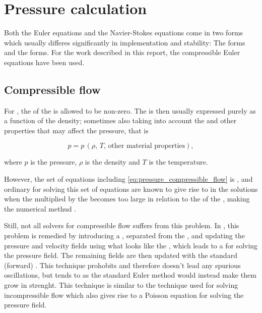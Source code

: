 \section{Pressure calculation}

Both the Euler equations and the Navier-Stokes equations come in two forms which usually differes significantly in implementation and stability: The \compressible forms and the \incompressible forms. For the work described in this report, the compressible Euler equations have been used. %

\subsection{Compressible flow}

For , the \divergence of the  is allowed to be non-zero. The \pressure is then usually expressed purely as a function of the density; sometimes also taking into account the \temperature and other properties that may affect the pressure, that is

\begin{equation} \label{eq:pressure_compressible_flow}
p = p\,(\rho,\,T,\,\text{other material properties}),
\end{equation}

where $p$ is the pressure, $\rho$ is the density and $T$ is the temperature.

However, the set of equations including \eqref{eq:pressure_compressible_flow} is , and ordinary  for solving this set of equations are known to give rise to  in the solutions when the  multiplied by the  becomes too large in relation to the  of the \cells, making the numerical methud \unstable.

Still, not all solvers for compressible flow suffers from this problem. In \citep{Kwatra2009}, this problem is remedied by introducing a , separated from the , and updating the pressure and velocity fields using what looks like the , which leads to a  for solving the pressure field. The remaining fields are then updated with the standard (forward) . This technique prohobits  and therefore doesn't lead any spurious oscillations, but tends to \damp {}  as the standard Euler method would instead make them grow in strenght. This technique is similar to the technique used for solving incompressible flow which also gives rise to a Poisson equation for solving the pressure field.


